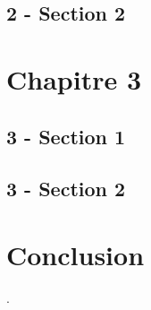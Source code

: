 \documentclass[11pt,a4paper]{report}
\begin{document}
\section{2 - Section 2}

\chapter{Chapitre 3}

\section{3 - Section 1}

\section{3 - Section 2}


\chapter*{Conclusion}
.



%

\end{document}
